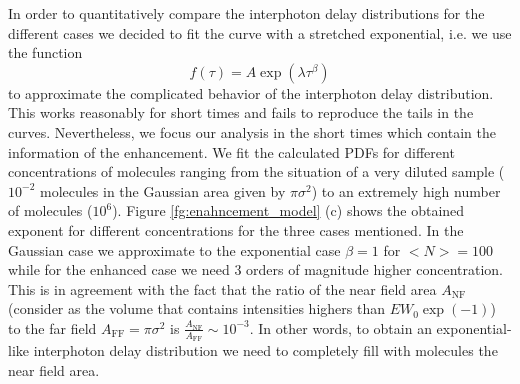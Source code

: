 In order to quantitatively compare the interphoton delay distributions for the different cases we decided to 
fit the curve with a stretched exponential, i.e. we use the function
\begin{equation}
f(\tau) = A \exp\left( \lambda \tau^\beta\right)
\label{eq:strechted_exp}
\end{equation}
to approximate the complicated behavior of the interphoton delay distribution. This works reasonably for short 
times and fails to reproduce the tails in the curves. Nevertheless, we focus our analysis in the short times
which contain the information of the enhancement. We fit the calculated PDFs for different concentrations of molecules
ranging from the situation of a very diluted sample ($10^{-2}$ molecules in the Gaussian area given by $\pi \sigma^2$) to an extremely high number of molecules ($10^{6}$). Figure \ref{fg:enahncement_model} (c) shows the obtained exponent for
different concentrations for the three cases mentioned. In the Gaussian case we approximate to the exponential case
$\beta=1$ for $<N>=100$ while for the enhanced case we need 3 orders of magnitude higher concentration. This is
in agreement with the fact that the ratio of the near field area $A_\textrm{NF}$
(consider as the volume that contains intensities highers than $EW_0\exp(-1)$) to the far field $A_\textrm{FF}=\pi\sigma^2$ is $\frac{A_\textrm{NF}}{A_\textrm{FF}} \sim 10^{-3}$. In other words, to obtain an 
exponential-like interphoton delay distribution we need to completely fill with molecules the near field area. 




